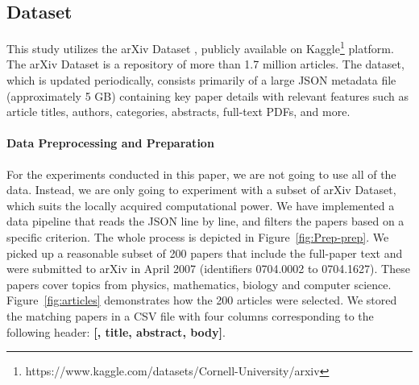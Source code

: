 \documentclass[bdcc,article,submit,pdftex,moreauthors]{Definitions/mdpi}
\begin{document}


\subsection{Dataset}
\label{sec:dataset}

This study utilizes the arXiv Dataset \citep{arxivdataset2024}, publicly available on Kaggle\footnote{https://www.kaggle.com/datasets/Cornell-University/arxiv} platform. The arXiv Dataset is a repository of more than 1.7 million articles. The dataset, which is updated periodically, consists primarily of a large JSON metadata file (approximately 5 GB) containing key paper details with relevant features such as article titles, authors, categories, abstracts, full-text PDFs, and more. 

\paragraph{Data Preprocessing and Preparation}
For the experiments conducted in this paper, we are not going to use all of the data. Instead, we are only going to experiment with a subset of arXiv Dataset, which suits the locally acquired computational power. We have implemented a data pipeline that reads the JSON line by line, and filters the papers based on a specific criterion.
 The whole process is depicted in Figure~\ref{fig:Prep-prep}. We picked up a reasonable subset of 200 papers that include the full-paper text 
and were submitted to arXiv in April 2007 (identifiers 0704.0002 to 0704.1627). These papers cover topics from physics, mathematics, biology and computer science. Figure~\ref{fig:articles} demonstrates how the 200 articles were selected. We stored the matching papers in a CSV file with four columns corresponding to the following header: \textbf{[, title, abstract, body]}.
\end{document}
